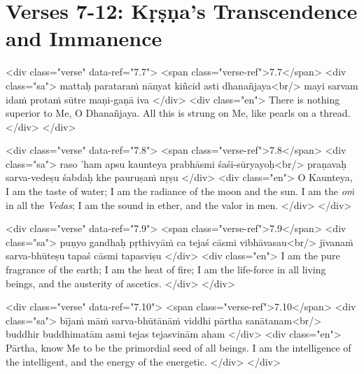 \newpage
\section{Verses 7-12: Kṛṣṇa's Transcendence and Immanence}\label{sec-verses-7-12-krsna-s-transcendence-and-immanence}


\begin{html}
<div class="verse" data-ref="7.7">
  <span class="verse-ref">7.7</span>
  <div class="sa">
    mattaḥ parataraṁ nānyat kiñcid asti dhanañjaya<br/>
    mayi sarvam idaṁ protaṁ sūtre maṇi-gaṇā iva
  </div>
  <div class="en">
    There is nothing superior to Me, O Dhanañjaya. All this is strung on Me, like pearls on a thread.
  </div>
</div>
\end{html}



\begin{html}
<div class="verse" data-ref="7.8">
  <span class="verse-ref">7.8</span>
  <div class="sa">
    raso ’ham apsu kaunteya prabhāsmi śaśi-sūryayoḥ<br/>
    praṇavaḥ sarva-vedeṣu śabdaḥ khe pauruṣaṁ nṛṣu
  </div>
  <div class="en">
    O Kaunteya, I am the taste of water; I am the radiance of the moon and the sun. I am the \textit{oṁ} in all the \textit{Vedas}; I am the sound in ether, and the valor in men.
  </div>
</div>
\end{html}



\begin{html}
<div class="verse" data-ref="7.9">
  <span class="verse-ref">7.9</span>
  <div class="sa">
    puṇyo gandhaḥ pṛthivyāṁ ca tejaś cāsmi vibhāvasau<br/>
    jīvanaṁ sarva-bhūteṣu tapaś cāsmi tapasviṣu
  </div>
  <div class="en">
    I am the pure fragrance of the earth; I am the heat of fire; I am the life-force in all living beings, and the austerity of ascetics.
  </div>
</div>
\end{html}



\begin{html}
<div class="verse" data-ref="7.10">
  <span class="verse-ref">7.10</span>
  <div class="sa">
    bījaṁ māṁ sarva-bhūtānāṁ viddhi pārtha sanātanam<br/>
    buddhir buddhimatām asmi tejas tejasvinām aham
  </div>
  <div class="en">
    Pārtha, know Me to be the primordial seed of all beings. I am the intelligence of the intelligent, and the energy of the energetic.
  </div>
</div>
\end{html}



